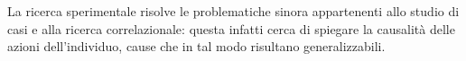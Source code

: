\documentclass{subfiles}
\begin{document}
La ricerca sperimentale risolve le problematiche sinora appartenenti allo studio di casi e alla ricerca correlazionale:
questa infatti cerca di spiegare la causalità delle azioni dell'individuo, cause che in tal modo risultano generalizzabili.
\end{document}
